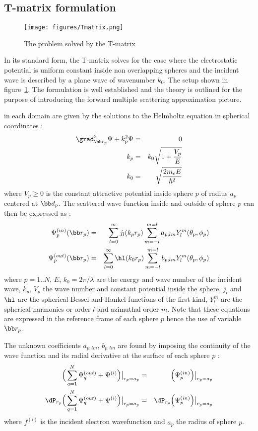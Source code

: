 \subsection{T-matrix formulation}

\begin{figure}
  \centering
  \texttt{[image: figures/Tmatrix.png]}
\caption{The problem solved by the T-matrix}\label{fig:Tmatrix}
\end{figure}

In its standard form, the T-matrix solves for the case where the electrostatic
potential is uniform constant inside non overlapping spheres and the
incident wave is described by a plane wave of wavenumber $k_0$.
The setup shown in figure~\ref{fig:Tmatrix}.
The formulation is well established and the theory is outlined for the purpose
of introducing the forward multiple scattering approximation picture.

in each domain are given by the solutions to the Helmholtz equation
in spherical coordinates :
%
\begin{eqnarray*}
  \grad_{\bb r_p}^2\Psi + k_p^2 \Psi &=& 0\\
  k_p &=& k_0\sqrt{1+\frac{V_p}{E}}\\
  k_0 &=& \sqrt{\frac{2m_eE}{\hbar^2}}\\
\end{eqnarray*}
%
where $V_p\ge 0$ is the constant attractive potential inside sphere
$p$ of radius $a_p$ centered at $\bb d_p$.
The scattered wave function inside and outside of sphere $p$ can
then be expressed as :
%
\begin{eqnarray*}
  \Psi_p^{(in )}(\bb r_p) &=& \sum_{l=0}^{\infty}j_l(k_pr_p)\sum_{m=-l}^{m=l}a_{p;lm}Y_l^m(\theta_p,\phi_p)\\
  \Psi_p^{(out)}(\bb r_p) &=& \sum_{l=0}^{\infty}\hl(k_0r_p)\sum_{m=-l}^{m=l}b_{p;lm}Y_l^m(\theta_p,\phi_p)\\
\end{eqnarray*}
%
where $p=1..N$, $E$, $k_0=2\pi/\lambda$ are the energy and wave number of the incident wave,
$k_p$, $V_p$ the wave number and constant potential inside the sphere,
$j_l$ and $\hl$ are the spherical Bessel and Hankel functions of the first
kind, $Y_l^m$ are the spherical harmonics or order $l$ and azimuthal order $m$.
Note that these equations are expressed in the reference frame of each
sphere $p$ hence the use of variable $\bb r_p$.

The unknown coefficients $a_{p;lm}$, $b_{p;lm}$ are found by imposing the
continuity of the wave function and its radial derivative at the surface of each
sphere $p$ :
%
\begin{eqnarray*}
      \Big(\sum_{q=1}^N \Psi_q^{(out)}+\Psi^{(i)}\Big)\big|_{r_p=a_p}
  &=& \Big(\Psi_p^{(in)}\Big)\big|_{r_p=a_p} \\
      \dP_{r_p}\Big(\sum_{q=1}^N \Psi_q^{(out)}+\Psi^{(i)}\Big)\big|_{r_p=a_p}
  &=& \dP_{r_p}\Big(\Psi_p^{(in)}\Big)\big|_{r_p=a_p} \\
\end{eqnarray*}
%
where $f^{(i)}$ is the incident electron wavefunction and $a_p$ the
radius of sphere $p$.

